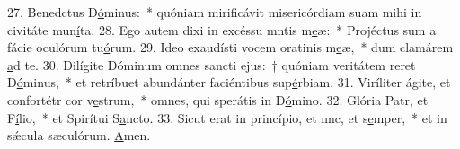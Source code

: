 27. Benedctus D\uline{ó}minus:~* quóniam mirificávit misericórdiam suam mihi in civitáte mun\uline{í}ta.
28. Ego autem dixi in excéssu mntis m\uline{e}æ:~* Projéctus sum a fácie oculórum tu\uline{ó}rum.
29. Ideo exaudísti vocem oratinis m\uline{e}æ,~* dum clamárem \uline{a}d te.
30. Dilígite Dóminum omnes sancti ejus:~† quóniam veritátem reret D\uline{ó}minus,~* et retríbuet abundánter faciéntibus sup\uline{é}rbiam.
31. Viríliter ágite, et confortétr cor v\uline{e}strum,~* omnes, qui sperátis in D\uline{ó}mino.
32. Glória Patr, et F\uline{í}lio,~* et Spirítui S\uline{a}ncto.
33. Sicut erat in princípio, et nnc, et s\uline{e}mper,~* et in sǽcula sæculórum. \uline{A}men.
